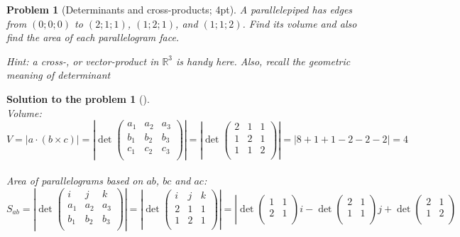 \documentclass[12pt,a4]{article}
\newtheorem{problem}{Problem}
\newtheorem{solution}{Solution to the problem}
\newcommand{\bR}{{\mathbb R}}
\begin{document}
\begin{problem}[Determinants and cross-products; 4pt]\rm \rm
	A parallelepiped has edges from $(0;0;0)$ to $(2;1;1)$, $(1;2;1)$, and $(1;1;2)$. Find its volume and also find the area of each parallelogram face.
	
    \small{\textsf{Hint: a cross-, or vector-product in $\bR^3$ is handy here. Also, recall the geometric meaning of determinant}}
\end{problem}

\begin{solution}[]\rm \quad \\
Volume:
\[
V = \left | a \cdot (b \times c)\right | = \left| \det
\begin{pmatrix}
a_1 & a_2 & a_3 \\
b_1 & b_2 & b_3 \\
c_1 & c_2 & c_3 \\
\end{pmatrix}
 \right| = \left| \det
\begin{pmatrix}
2 & 1 & 1 \\
1 & 2 & 1 \\
1 & 1 & 2 \\ 
\end{pmatrix}
 \right| = \left| 8 + 1 + 1 - 2 - 2 - 2 \right|  = 4
\]\\
Area of parallelograms based on $ab$, $bc$ and $ac$:
\[
S_{ab} = \left| \det  
\begin{pmatrix}
i & j & k \\
a_1 & a_2 & a_3 \\
b_1 & b_2 & b_3 \\
\end{pmatrix}
\right| = \left| \det  
\begin{pmatrix}
i & j & k \\
2 & 1 & 1 \\
1 & 2 & 1 \\
\end{pmatrix}
\right|
= \left| \det 
\begin{pmatrix}
1 & 1 \\
2 & 1 \\
\end{pmatrix} i - \det 
\begin{pmatrix}
2 & 1 \\
1 & 1 \\
\end{pmatrix} j + \det 
\begin{pmatrix}
2 & 1 \\
1 & 2 \\

\end{pmatrix}\]
\end{solution}
\end{document}
